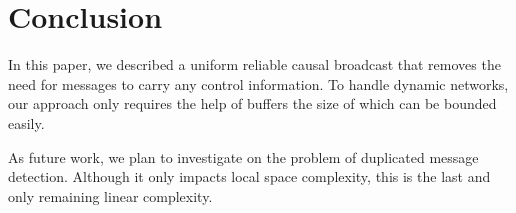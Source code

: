 
\section{Conclusion}
\label{sec:conclusion}

In this paper, we described a uniform reliable causal broadcast that removes the
need for messages to carry any control information. To handle dynamic networks,
our approach only requires the help of buffers the size of which can be bounded
easily. 



As future work, we plan to investigate on the problem of duplicated message
detection. Although it only impacts local space complexity, this is the last and
only remaining linear complexity.






